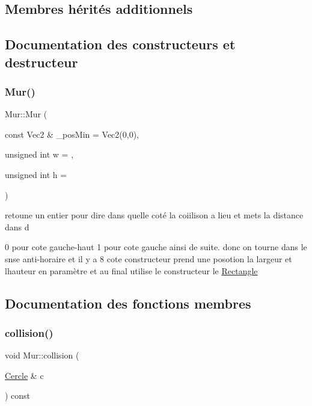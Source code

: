 \subsection*{Membres hérités additionnels}


\subsection{Documentation des constructeurs et destructeur}
\mbox{\label{class_mur_a52a18f3a0baad70fb413f39e3d29c5a3}} 
\subsubsection{\texorpdfstring{Mur()}{Mur()}}
{\footnotesize\ttfamily Mur\+::\+Mur (\begin{DoxyParamCaption}\item[{const Vec2 \&}]{\+\_\+pos\+Min = {\ttfamily Vec2(0,0)},  }\item[{unsigned int}]{w = {},  }\item[{unsigned int}]{h = {} }\end{DoxyParamCaption})\hspace{0.3cm}{\ttfamily [inline]}}



retoune un entier pour dire dans quelle coté la coiilison a lieu et mets la distance dans d 

0 pour cote gauche-\/haut 1 pour cote gauche ainsi de suite. donc on tourne dans le snse anti-\/horaire et il y a 8 cote constructeur prend une posotion la largeur et l\textquotesingle{}hauteur en paramètre et au final utilise le constructeur le \mbox{\hyperlink{class_rectangle}{Rectangle}} 

\subsection{Documentation des fonctions membres}
\mbox{\label{class_mur_a63a7560c521670716cd90c3599abcd71}} 
\subsubsection{\texorpdfstring{collision()}{collision()}}
{\footnotesize\ttfamily void Mur\+::collision (\begin{DoxyParamCaption}\item[{\mbox{\hyperlink{class_cercle}{Cercle}} \&}]{c }\end{DoxyParamCaption}) const}



